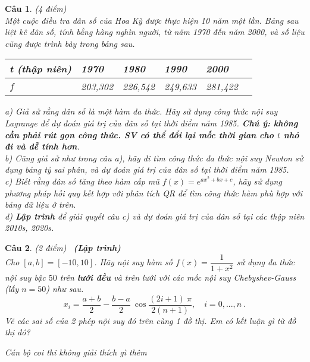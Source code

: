 \documentclass[10pt]{article}
\newtheorem{bt}{Câu}
\begin{document}
\begin{bt}(4 điểm) \\
Một cuộc điều tra dân số của Hoa Kỳ được thực hiện 10 năm một lần. Bảng sau liệt kê dân số, tính bằng hàng nghìn người, từ năm 1970 đến năm 2000, và số liệu cũng được trình bày trong bảng sau.
	\begin{center}
			\begin{tabular}[6]{|l|l|l|l|l|l} \hline
			t (thập niên) & 1970 & 1980 & 1990 & 2000   \\ \hline 
			$f$ & 203,302 & 226,542 & 249,633 & 281,422 \\ \hline
		\end{tabular}	
	\end{center}
a) Giả sử rằng dân số là một hàm đa thức. Hãy sử dụng công thức nội suy Lagrange để dự đoán giá trị của dân số tại thời điểm năm 1985. \textbf{Chú ý: không cần phải rút gọn công thức. SV có thể đổi lại mốc thời gian cho $t$ nhỏ đi và dễ tính hơn}. \\
b) Cũng giả sử như trong câu a), hãy đi tìm công thức đa thức nội suy Newton sử dụng bảng tỷ sai phân, và dự đoán giá trị của dân số tại thời điểm năm 1985. \\
c) Biết rằng dân số tăng theo hàm cấp mũ $f(x) = e^{ax^2+bx+c}$, hãy sử dụng phương pháp hồi quy kết hợp với phân tích QR để tìm công thức hàm phù hợp với bảng dữ liệu ở trên. \\
d) \textbf{Lập trình} để giải quyết câu c) và dự đoán giá trị của dân số tại các thập niên 2010s, 2020s.   
\end{bt}

\begin{bt}(2 điểm) \ \textbf{(Lập trình)} \\
Cho $[a,b] = [-10,10]$. Hãy nội suy hàm số $f(x) = \dfrac{1}{1 + x^2}$ sử dụng đa thức nội suy bậc $50$ trên \textbf{lưới đều} và trên lưới với các mốc nội suy Chebyshev-Gauss (lấy $n = 50$) như sau. 
%
\[
x_i = \dfrac{a+b}{2} - \dfrac{b-a}{2} \ \cos\dfrac{(2i+1) \ \pi }{2(n+1)}, \quad i = 0, . . . , n \ .
\]
%
Vẽ các sai số của 2 phép nội suy đó trên cùng 1 đồ thị. Em có kết luận gì từ đồ thị đó?
\end{bt}

\vspace{1cm}
 {\it Cán bộ coi thi không giải thích gì thêm}\\
\end{document}

